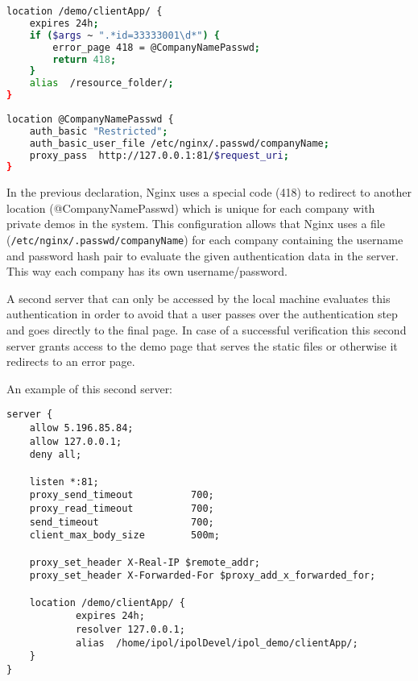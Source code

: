\begin{footnotesize}
\begin{lstlisting}[language=Bash]
location /demo/clientApp/ {
    expires 24h;
    if ($args ~ ".*id=33333001\d*") {
        error_page 418 = @CompanyNamePasswd;
        return 418;
    }
    alias  /resource_folder/;
}
    
location @CompanyNamePasswd {
    auth_basic "Restricted";
    auth_basic_user_file /etc/nginx/.passwd/companyName;
    proxy_pass  http://127.0.0.1:81/$request_uri;
}
\end{lstlisting}
\end{footnotesize}

In the previous declaration, Nginx uses a special code (418) to redirect to another location (@CompanyNamePasswd) which is unique for each company with private demos in the system. This configuration allows that Nginx uses a file ({\tt /etc/nginx/.passwd/companyName}) for each company containing the username and password hash pair to evaluate the given authentication data in the server. This way each company has its own username/password.

A second server that can only be accessed by the local machine evaluates this authentication in order to avoid that a user passes over the authentication step and goes directly to the final page. In case of a successful verification this second server grants access to the demo page that serves the static files or otherwise it redirects to an error page.

An example of this second server:
\begin{footnotesize}
\begin{lstlisting}
server {
    allow 5.196.85.84;
    allow 127.0.0.1;
    deny all;

    listen *:81;
    proxy_send_timeout          700;
    proxy_read_timeout          700;
    send_timeout                700;
    client_max_body_size        500m;

    proxy_set_header X-Real-IP $remote_addr;
    proxy_set_header X-Forwarded-For $proxy_add_x_forwarded_for;

    location /demo/clientApp/ {
            expires 24h;
            resolver 127.0.0.1;
            alias  /home/ipol/ipolDevel/ipol_demo/clientApp/;
    }
}
\end{lstlisting}
\end{footnotesize}